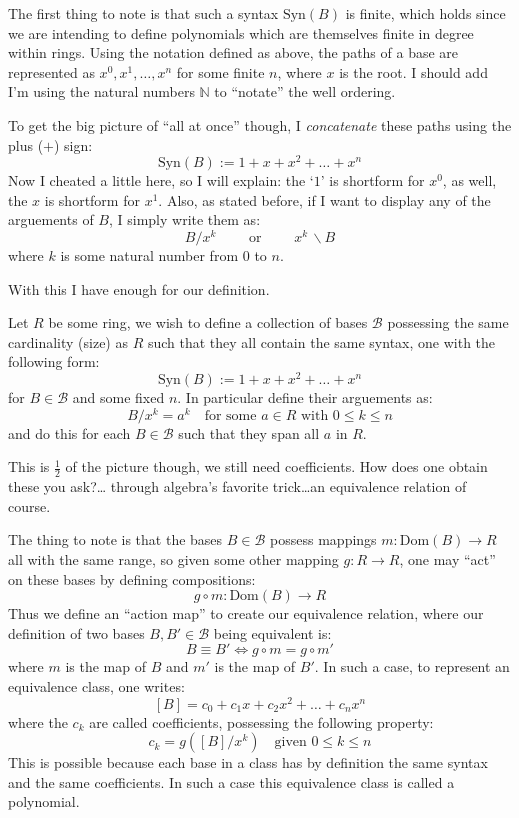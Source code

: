 \documentclass[twoside]{book}
\begin{document}
The first thing to note is that such a syntax $ \mbox{Syn}(B) $ is finite, which holds since we are intending to define
polynomials which are themselves finite in degree within rings.  Using the notation defined as above, the paths of a base
are represented as $ x^0, x^1,\ldots, x^n $ for some finite $ n $, where $ x $ is the root.  I should add I'm using
the natural numbers $ \mathbb{N} $ to ``notate'' the well ordering.

To get the big picture of ``all at once'' though, I \emph{concatenate} these paths using the plus ($ + $) sign:
$$ \mbox{Syn}(B):=1+x+x^2+\ldots+x^n $$
Now I cheated a little here, so I will explain: the `$ 1 $' is shortform for $ x^0 $, as well, the $ x $ is shortform
for $ x^1 $.  Also, as stated before, if I want to display any of the arguements of $ B $, I simply write them as:
$$ B/x^k\qquad\mbox{ or }\qquad x^k\,\backslash B $$
where $ k $ is some natural number from $ 0 $ to $ n $.

With this I have enough for our definition.

Let $ R $ be some ring, we wish to define a collection of bases $ \mathcal{B} $ possessing the same
cardinality (size) as $ R $ such that they all contain the same syntax, one with the following form:
$$ \mbox{Syn}(B):=1+x+x^2+\ldots+x^n $$
for $ B\in\mathcal{B} $ and some fixed $ n $.  In particular define their arguements as:
$$ B/x^k=a^k\quad\mbox{for some } a\in R\mbox{ with } 0\le k\le n $$
and do this for each $ B\in\mathcal{B} $ such that they span all $ a $ in $ R $.

This is $ \frac{1}{2} $ of the picture though, we still need coefficients.  How does one obtain these you ask?\ldots
through algebra's favorite trick\ldots an equivalence relation of course.

The thing to note is that the bases $ B\in\mathcal{B} $ possess mappings $ m:\mbox{Dom}(B)\to R $ all with the same range,
so given some other mapping $ g:R\to R $, one may ``act'' on these bases by defining compositions:
$$ g\circ m:\mbox{Dom}(B)\to R $$
Thus we define an ``action map'' to create our equivalence relation, where our definition of two bases
$ B, B'\in\mathcal{B} $ being equivalent is:
$$ B\equiv B'\Longleftrightarrow g\circ m=g\circ m' $$
where $ m $ is the map of $ B $ and $ m' $ is the map of $ B' $.  In such a case, to represent an equivalence class,
one writes:
$$ [B]=c_0+c_1x+c_2x^2+\ldots+c_nx^n $$
where the $ c_k $ are called coefficients, possessing the following property:
$$ c_k=g([B]/x^k)\quad\mbox{given } 0\le k\le n $$
This is possible because each base in a class has by definition the same syntax and the same coefficients.
In such a case this equivalence class is called a polynomial.
\end{document}
